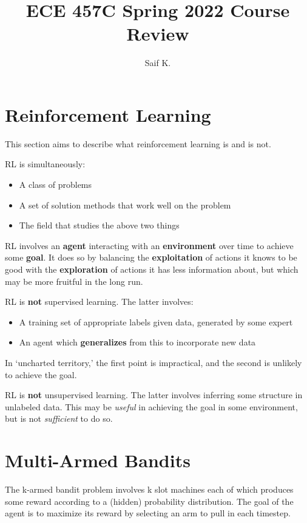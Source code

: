 \documentclass[11pt]{report}
\title{ECE 457C Spring 2022 Course Review}
\author{Saif K.}
\begin{document}
\maketitle

\chapter{Reinforcement Learning}
This section aims to describe what reinforcement learning is and is not.

RL is simultaneously:
\begin{itemize}
	\item A class of problems
	\item A set of solution methods that work well on the problem
	\item The field that studies the above two things
\end{itemize}

RL involves an \textbf{agent} interacting with an \textbf{environment} over time to achieve some \textbf{goal}. It does so by balancing the \textbf{exploitation} of actions it knows to be good with the \textbf{exploration} of actions it has less information about, but which may be more fruitful in the long run.

RL is \textbf{not} supervised learning. The latter involves:
\begin{itemize}
	\item A training set of appropriate labels given data, generated by some expert
	\item An agent which \textbf{generalizes} from this to incorporate new data
\end{itemize}
In `uncharted territory,' the first point is impractical, and the second is unlikely to achieve the goal.

RL is \textbf{not} unsupervised learning. The latter involves inferring some structure in unlabeled data. This may be \textit{useful} in achieving the goal in some environment, but is not \textit{sufficient} to do so.



\chapter{Multi-Armed Bandits}
The k-armed bandit problem involves k slot machines each of which produces some reward according to a (hidden) probability distribution. The goal of the agent is to maximize its reward by selecting an arm to pull in each timestep.
\end{document}
